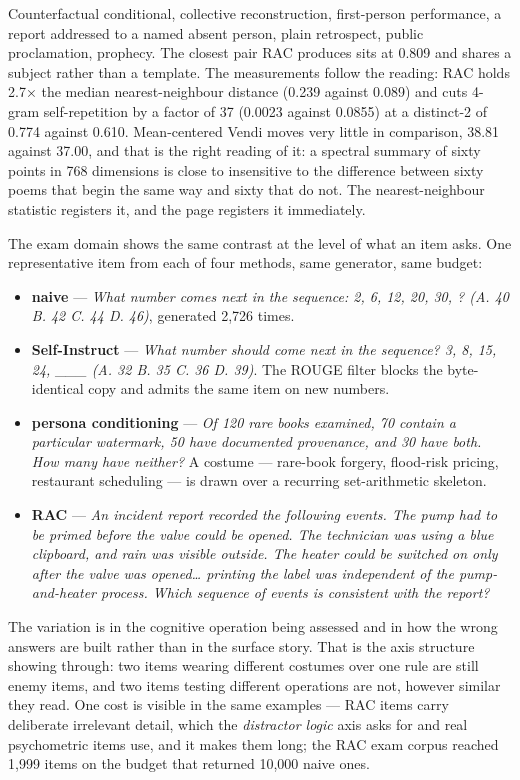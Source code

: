 \documentclass[
  10pt,
]{article}
\providecommand{\tightlist}{%
  \setlength{\itemsep}{0pt}\setlength{\parskip}{0pt}}
\theoremstyle{plain}
\theoremstyle{definition}
\providecommand{\tightlist}{\setlength{\itemsep}{0pt}\setlength{\parskip}{0pt}}
\begin{document}
Counterfactual conditional, collective reconstruction, first-person
performance, a report addressed to a named absent person, plain
retrospect, public proclamation, prophecy. The closest pair RAC produces
sits at 0.809 and shares a subject rather than a template. The
measurements follow the reading: RAC holds 2.7× the median
nearest-neighbour distance (0.239 against 0.089) and cuts 4-gram
self-repetition by a factor of 37 (0.0023 against 0.0855) at a
distinct-2 of 0.774 against 0.610. Mean-centered Vendi moves very little
in comparison, 38.81 against 37.00, and that is the right reading of it:
a spectral summary of sixty points in 768 dimensions is close to
insensitive to the difference between sixty poems that begin the same
way and sixty that do not. The nearest-neighbour statistic registers it,
and the page registers it immediately.

The exam domain shows the same contrast at the level of what an item
asks. One representative item from each of four methods, same generator,
same budget:

\begin{itemize}
\tightlist
\item
  \textbf{naive} --- \emph{What number comes next in the sequence: 2, 6,
  12, 20, 30, ? (A. 40 B. 42 C. 44 D. 46)}, generated 2,726 times.
\item
  \textbf{Self-Instruct} --- \emph{What number should come next in the
  sequence? 3, 8, 15, 24, \_\_\_ (A. 32 B. 35 C. 36 D. 39)}. The ROUGE
  filter blocks the byte-identical copy and admits the same item on new
  numbers.
\item
  \textbf{persona conditioning} --- \emph{Of 120 rare books examined, 70
  contain a particular watermark, 50 have documented provenance, and 30
  have both. How many have neither?} A costume --- rare-book forgery,
  flood-risk pricing, restaurant scheduling --- is drawn over a
  recurring set-arithmetic skeleton.
\item
  \textbf{RAC} --- \emph{An incident report recorded the following
  events. The pump had to be primed before the valve could be opened.
  The technician was using a blue clipboard, and rain was visible
  outside. The heater could be switched on only after the valve was
  opened\ldots{} printing the label was independent of the
  pump-and-heater process. Which sequence of events is consistent with
  the report?}
\end{itemize}

The variation is in the cognitive operation being assessed and in how
the wrong answers are built rather than in the surface story. That is
the axis structure showing through: two items wearing different costumes
over one rule are still enemy items, and two items testing different
operations are not, however similar they read. One cost is visible in
the same examples --- RAC items carry deliberate irrelevant detail,
which the \emph{distractor logic} axis asks for and real psychometric
items use, and it makes them long; the RAC exam corpus reached 1,999
items on the budget that returned 10,000 naive ones.
\end{document}
